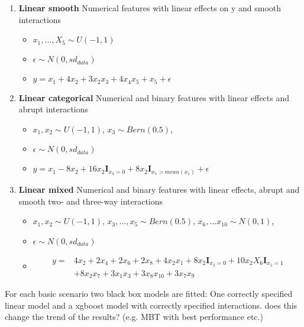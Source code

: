 \begin{enumerate}
    \item \textbf{Linear smooth}
        Numerical features with linear effects on y and smooth interactions
        \begin{itemize}
            \item $x_1,..., X_5 \sim U(-1,1)$
            \item $\epsilon \sim N(0, sd_{data})$
            \item $ y = x_1 + 4   x_2 + 3   x_2   x_3 + 4  x_4  x_5 + x_5 + \epsilon$
           
        \end{itemize}
    \item \textbf{Linear categorical}
        Numerical and binary features with linear effects and abrupt interactions
        \begin{itemize}
            \item $x_1, x_2 \sim U(-1,1)$, $x_3 \sim Bern(0.5)$,  
            \item $\epsilon \sim N(0, sd_{data})$
            \item $ y =  x_{1} - 8  x_2 + 16  x_2  \mathbf{I}_{x_3 = 0} + 8  x_2  \mathbf{I}_{x_1 > mean(x_1)} + \epsilon $
            
        \end{itemize}
    \item \textbf{Linear mixed}
        Numerical and binary features with linear effects, abrupt and smooth two- and three-way interactions
        \begin{itemize}
            \item $x_1, x_2 \sim U(-1,1)$, $x_3, ..., x_5 \sim Bern(0.5)$, $x_6, ... x_{10} \sim N(0,1)$,  \item $\epsilon \sim N(0, sd_{data})$
            \item \begin{align*}
            y = & 4   x_2 + 2   x_4 + 2   x_6 + 2   x_8 + 4   x_2   x_1 + 8   x_2   \mathbf{I}_{x_3 = 0} + 10   x_2   X_6    \mathbf{I}_{x_5 = 1} \\
            & + 8   x_2   x_7 + 3   x_1   x_3 + 3   x_8   x_{10} + 3   x_7   x_9     
            \end{align*}
    
        \end{itemize}
\end{enumerate}

For each basic scenario two black box models are fitted: One correctly specified linear model and a xgboost model with correctly specified interactions. 
\color{blue}
does this change the trend of the results? (e.g. MBT with best performance etc.)

